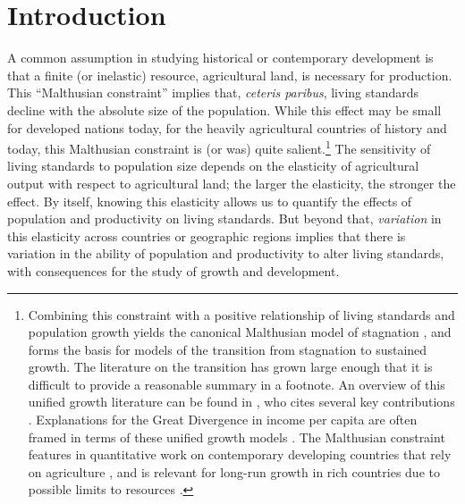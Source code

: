 \documentclass[11pt]{article}
\begin{document}
\pagebreak 

\section{Introduction}
\onehalfspacing 
A common assumption in studying historical or contemporary development is that a finite (or inelastic) resource, agricultural land, is necessary for production. This ``Malthusian constraint'' implies that, \textit{ceteris paribus}, living standards decline with the absolute size of the population. While this effect may be small for developed nations today, for the heavily agricultural countries of history and today, this Malthusian constraint is (or was) quite salient.\footnote{Combining this constraint with a positive relationship of living standards and population growth yields the canonical Malthusian model of stagnation \citep{ashraf2010dynamics}, and forms the basis for models of the transition from stagnation to sustained growth. The literature on the transition has grown large enough that it is difficult to provide a reasonable summary in a footnote. An overview of this unified growth literature can be found in \citet{Galor:2011uq}, who cites several key contributions \citep{gw00,galor2002natural,Hansen:2002fk,doepke2004accounting,cs2005,lagerlof2006,craftsmills2009,strulik2008population}. Explanations for the Great Divergence in income per capita are often framed in terms of these unified growth models \citep{kp2001,galor2008trading,vollrath2011,vv08,vv13,cs2015}. The Malthusian constraint features in quantitative work on contemporary developing countries that rely on agriculture \citep{Gollin:2007oq,Restuccia:2008hc,weilwilde2009,Gollin:2010ys,ev2016clim}, and is relevant for long-run growth in rich countries due to possible limits to resources \citep{perettovalente2015}.} The sensitivity of living standards to population size depends on the elasticity of agricultural output with respect to agricultural land; the larger the elasticity, the stronger the effect. By itself, knowing this elasticity allows us to quantify the effects of population and productivity on living standards. But beyond that, \textit{variation} in this elasticity across countries or geographic regions implies that there is variation in the ability of population and productivity to alter living standards, with consequences for the study of growth and development. 
\end{document}
